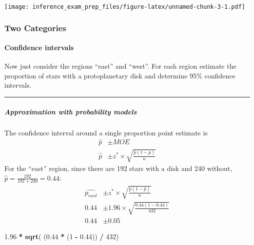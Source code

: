 \documentclass[]{article}
\newenvironment{Shaded}{\begin{snugshade}}{\end{snugshade}}
\newcommand{\DecValTok}[1]{\textcolor[rgb]{0.00,0.00,0.81}{#1}}
\newcommand{\FloatTok}[1]{\textcolor[rgb]{0.00,0.00,0.81}{#1}}
\newcommand{\KeywordTok}[1]{\textcolor[rgb]{0.13,0.29,0.53}{\textbf{#1}}}
\newcommand{\NormalTok}[1]{#1}
\newcommand{\OperatorTok}[1]{\textcolor[rgb]{0.81,0.36,0.00}{\textbf{#1}}}
\newcommand{\StringTok}[1]{\textcolor[rgb]{0.31,0.60,0.02}{#1}}
\let\oldparagraph\paragraph
\renewcommand{\paragraph}[1]{\oldparagraph{#1}\mbox{}}
\let\oldsubparagraph\subparagraph
\renewcommand{\subparagraph}[1]{\oldsubparagraph{#1}\mbox{}}
\begin{document}
\texttt{[image: inference\_exam\_prep\_files/figure-latex/unnamed-chunk-3-1.pdf]}

\hypertarget{two-categories}{%
\subsubsection{Two Categories}\label{two-categories}}

\hypertarget{confidence-intervals}{%
\paragraph{Confidence intervals}\label{confidence-intervals}}

Now just consider the regions ``east'' and ``west''. For eash region
estimate the proportion of stars with a protoplanetary disk and
determine \(95\%\) confidence intervals.

\begin{center}\rule{0.5\linewidth}{\linethickness}\end{center}

\hypertarget{approximation-with-probability-models}{%
\subparagraph{Approximation with probability
models}\label{approximation-with-probability-models}}

The confidence interval around a single proportion point estimate is \[
\begin{aligned}
\hat{p} & \pm MOE \\
\hat{p} & \pm z^{*} \times \sqrt{\frac{\hat{p}(1-\hat{p})}{n}}
\end{aligned}
\] For the ``east'' region, since there are 192 stars with a disk and
240 without, \(\hat{p} = \frac{192}{192 + 240} = 0.44\): \[
\begin{aligned}
\hat{p_{east}} & \pm z^{*} \times \sqrt{\frac{\hat{p}(1-\hat{p})}{n}} \\
0.44 & \pm 1.96 \times \sqrt{\frac{0.44(1-0.44)}{432}} \\
0.44 & \pm 0.05
\end{aligned}
\]

\begin{Shaded}
\begin{Highlighting}[]
\FloatTok{1.96} \OperatorTok{*}\StringTok{ }\KeywordTok{sqrt}\NormalTok{( (}\FloatTok{0.44} \OperatorTok{*}\StringTok{ }\NormalTok{(}\DecValTok{1} \OperatorTok{-}\StringTok{ }\FloatTok{0.44}\NormalTok{)) }\OperatorTok{/}\StringTok{ }\DecValTok{432}\NormalTok{)}
\end{Highlighting}
\end{Shaded}
\end{document}
